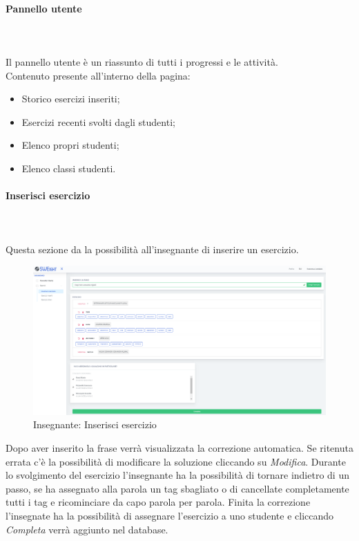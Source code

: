         
        
        \paragraph{Pannello utente}\mbox{}\\ \\
          Il pannello utente è un riassunto di tutti i progressi e le attività.
         \\Contenuto presente all'interno della pagina:
        	\begin{itemize}
        	\item Storico esercizi inseriti; 
        	\item Esercizi recenti svolti dagli studenti;
        	\item Elenco propri studenti;
        	\item Elenco classi studenti.
        	\end{itemize}
        
        
        
        
        \paragraph{Inserisci esercizio}\mbox{}\\ \\
          Questa sezione da la possibilità all'insegnante di inserire un esercizio.
        	\begin{figure}[H]
            \centering
        	\includegraphics[width=17cm]{sez/img/insegnante/inserisciEsercizio.png} 
            \caption{Insegnante: Inserisci esercizio}\label{fig:1}
        	\end{figure}
        
          Dopo aver inserito la frase verrà visualizzata la correzione automatica. Se ritenuta errata c'è la possibilità di modificare la soluzione cliccando su \textit{Modifica}. Durante lo svolgimento del esercizio l'insegnante ha la possibilità di tornare indietro di un passo, se ha assegnato alla parola un tag sbagliato o di cancellate completamente tutti i tag e ricominciare da capo parola per parola. Finita la correzione l'insegnate ha la possibilità di assegnare l'esercizio a uno studente e cliccando \textit{Completa} verrà aggiunto nel database.
        
